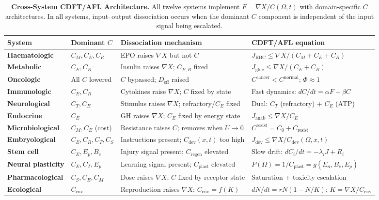 \documentclass[11pt]{article}
\newcommand{\Om}{\Omega}
\begin{document}
\begin{table}[H]
\centering
\caption{\textbf{Cross-System CDFT/AFL Architecture.} All twelve systems implement
$F = \nabla X/C(\Om,t)$ with domain-specific $C$ architectures.
In all systems, input--output dissociation occurs when the dominant $C$ component
is independent of the input signal being escalated.}
\label{tab:crosssystem}
\small
\setlength{\tabcolsep}{3pt}
\begin{tabularx}{\linewidth}{>{\bfseries\small}lXXX}
\toprule
System & Dominant $C$ & Dissociation mechanism & CDFT/AFL equation \\
\midrule
Haematologic & $C_M, C_E, C_R$ & EPO raises $\nabla X$ but not $C$ & $J_{\mathrm{RBC}} \leq \nabla X/(C_M+C_E+C_R)$ \\[3pt]
Metabolic & $C_E, C_R$ & Insulin raises $\nabla X$; $C_{E,R}$ fixed & $J_{\mathrm{gluc}} \leq \nabla X/(C_E+C_R)$ \\[3pt]
Oncologic & All $C$ lowered & $C$ bypassed; $D_{\mathrm{eff}}$ raised & $C^{\mathrm{cancer}} < C^{\mathrm{normal}}$; $\Phi \approx 1$ \\[3pt]
Immunologic & $C_E, C_R$ & Cytokines raise $\nabla X$; $C$ fixed by state & Fast dynamics: $dC/dt = \alpha F - \beta C$ \\[3pt]
Neurological & $C_T, C_E$ & Stimulus raises $\nabla X$; refractory/$C_E$ fixed & Dual: $C_T$ (refractory) + $C_E$ (ATP) \\[3pt]
Endocrine & $C_E$ & GH raises $\nabla X$; $C_E$ fixed by energy state & $J_{\mathrm{anab}} \leq \nabla X/C_E$ \\[3pt]
Microbiological & $C_M, C_E$ (cost) & Resistance raises $C$; removes when $U \to 0$ & $C^{\mathrm{resist}} = C_0 + C_{\mathrm{resist}}$ \\[3pt]
Embryological & $C_E, C_R, C_T, C_S$ & Instructions present; $C_{\mathrm{dev}}(x,t)$ too high & $J_{\mathrm{dev}} \leq \nabla X/C_{\mathrm{dev}}(\Om,x,t)$ \\[3pt]
Stem cell & $C_E, E_p, B_e$ & Injury signal present; $C_{\mathrm{regen}}$ elevated & Slow drift: $dC_i/dt = -\lambda_i J + R_i$ \\[3pt]
Neural plasticity & $C_E, C_T, E_p$ & Learning signal present; $C_{\mathrm{plast}}$ elevated & $P(\Om) = 1/C_{\mathrm{plast}} = g(E_n, B_e, E_p)$ \\[3pt]
Pharmacological & $C_S, C_E, C_M$ & Dose raises $\nabla X$; $C$ fixed by receptor state & Saturation + toxicity escalation \\[3pt]
Ecological & $C_{\mathrm{env}}$ & Reproduction raises $\nabla X$; $C_{\mathrm{env}} = f(K)$ & $dN/dt = rN(1-N/K)$; $K = \nabla X/C_{\mathrm{env}}$ \\
\bottomrule
\end{tabularx}
\end{table}
\end{document}
